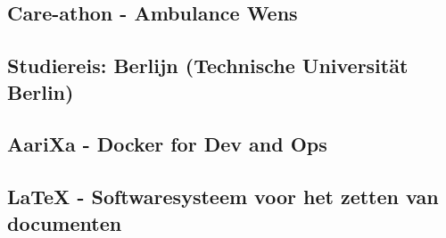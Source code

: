 


\subsection{Care\hyp{}athon - Ambulance Wens}


\subsection{Studiereis: Berlijn (Technische Universit\"at Berlin)}


\subsection{AariXa - Docker for Dev and Ops}


\subsection{\LaTeX{} - Softwaresysteem voor het zetten van documenten}

